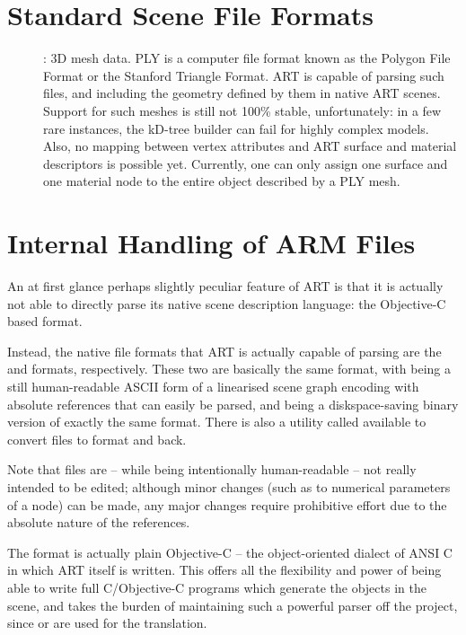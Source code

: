 \section{Standard Scene File Formats}
\label{sect:stdsceneformats}

\begin{description}
\item[]: 3D mesh data. PLY is a computer file format known as the Polygon File Format or the Stanford Triangle Format. ART is capable of parsing such files, and including the geometry defined by them in native ART scenes. Support for such meshes is still not 100\% stable, unfortunately: in a few rare instances, the kD-tree builder can fail for highly complex models. Also, no mapping between vertex attributes and ART surface and material descriptors is possible yet. Currently, one can only assign one surface and one material node to the entire object described by a PLY mesh.


\end{description}

\section{Internal Handling of ARM Files}
\label{sec:ARTscenefileformat}

An at first glance perhaps slightly peculiar feature of ART is that it is actually not able to directly parse its native scene description language: the
Objective-C based  format. 

Instead, the native file formats that ART is actually capable of parsing are the  and  formats, respectively. These two are basically the same format,
with  being a still human-readable ASCII form of a linearised scene
graph encoding with absolute references that can easily be parsed, and
 being a diskspace-saving binary version of exactly the same
format. There is also a utility called  available to convert
 files to  format and back.

Note that  files are -- while being intentionally
human-readable -- not really intended to be edited; although minor changes
(such as to numerical parameters of a node) can be made, any major
changes require prohibitive effort due to the absolute nature of the
references.

The  format is actually plain Objective-C -- the
object-oriented dialect of ANSI C in which ART itself is written. This
offers all the flexibility and power of being able to write full
C/Objective-C programs which generate the objects in the scene, and takes the
burden of maintaining such a powerful parser off the project, since
 or  are used for the translation.

